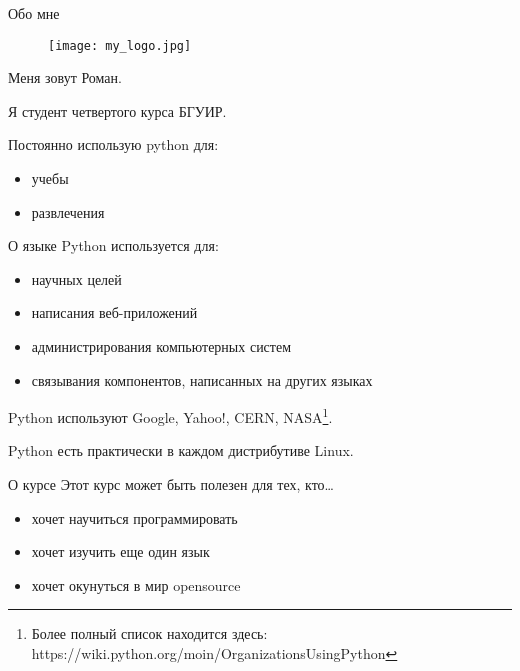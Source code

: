 \documentclass[hyperref={pdftex,unicode}]{beamer}
\begin{document}
\begin{frame}
  \maketitle
\end{frame}

\begin{frame}{Обо мне}
  \begin{minipage}{0.3\linewidth}
    \begin{figure}[H]
      \texttt{[image: my\_logo.jpg]}
    \end{figure}
  \end{minipage}
  \hfill
  \begin{minipage}{0.6\linewidth}
    Меня зовут Роман. 
    
    Я студент четвертого курса БГУИР.

    Постоянно использую python для:
    \begin{itemize}
      \item учебы
      \item развлечения
    \end{itemize}
  \end{minipage}
\end{frame}

\begin{frame}{О языке}
  Python используется для:
  \begin{itemize}
    \item научных целей
    \item написания веб-приложений
    \item администрирования компьютерных систем
    \item связывания компонентов, написанных на других языках
  \end{itemize}

  Python используют Google, Yahoo!, CERN, NASA\footnote[frame]{
    Более полный список находится здесь: 
    https://wiki.python.org/moin/OrganizationsUsingPython}.

  Python есть практически в каждом дистрибутиве Linux.
\end{frame}

\begin{frame}{О курсе}
  Этот курс может быть полезен для тех, кто\dots
  \begin{itemize}
    \item хочет научиться программировать
    \item хочет изучить еще один язык
    \item хочет окунуться в мир opensource
  \end{itemize}
\end{frame}
\end{document}
